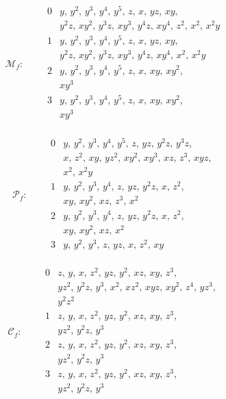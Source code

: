 \documentclass[11pt]{amsart}
\theoremstyle{definition}
\theoremstyle{remark}
\numberwithin{equation}{section}
\begin{document}
\[
\mathcal M_f:\qquad\begin{array}{c|l}
0&y,\,y^{2},\,y^{3},\,y^{4},\,y^{5},\,z,\,x,\,yz,\,xy,\\
&y^{2}z,\,xy^{2},\,y^{3}z,\,xy^{3},\,y^{4}z,\,xy^{4},\,z^{2},\,x^{2},\,x^{2}y\\
1&y,\,y^{2},\,y^{3},\,y^{4},\,y^{5},\,z,\,x,\,yz,\,xy,\\
&y^{2}z,\,xy^{2},\,y^{3}z,\,xy^{3},\,y^{4}z,\,xy^{4},\,x^{2},\,x^{2}y\\
2&y,\,y^{2},\,y^{3},\,y^{4},\,y^{5},\,z,\,x,\,xy,\,xy^{2},\\
&xy^{3}\\
3&y,\,y^{2},\,y^{3},\,y^{4},\,y^{5},\,z,\,x,\,xy,\,xy^{2},\\
&xy^{3}\\
\end{array}
\]

\[
\mathcal P_f:\qquad\begin{array}{c|l}
0&y,\,y^{2},\,y^{3},\,y^{4},\,y^{5},\,z,\,yz,\,y^{2}z,\,y^{3}z,\\
&x,\,z^{2},\,xy,\,yz^{2},\,xy^{2},\,xy^{3},\,xz,\,z^{3},\,xyz,\\
&x^{2},\,x^{2}y\\
1&y,\,y^{2},\,y^{3},\,y^{4},\,z,\,yz,\,y^{2}z,\,x,\,z^{2},\\
&xy,\,xy^{2},\,xz,\,z^{3},\,x^{2}\\
2&y,\,y^{2},\,y^{3},\,y^{4},\,z,\,yz,\,y^{2}z,\,x,\,z^{2},\\
&xy,\,xy^{2},\,xz,\,x^{2}\\
3&y,\,y^{2},\,y^{3},\,z,\,yz,\,x,\,z^{2},\,xy\\
\end{array}
\]

\[
\mathcal C_f:\qquad\begin{array}{c|l}
0&z,\,y,\,x,\,z^{2},\,yz,\,y^{2},\,xz,\,xy,\,z^{3},\\
&yz^{2},\,y^{2}z,\,y^{3},\,x^{2},\,xz^{2},\,xyz,\,xy^{2},\,z^{4},\,yz^{3},\\
&y^{2}z^{2}\\
1&z,\,y,\,x,\,z^{2},\,yz,\,y^{2},\,xz,\,xy,\,z^{3},\\
&yz^{2},\,y^{2}z,\,y^{3}\\
2&z,\,y,\,x,\,z^{2},\,yz,\,y^{2},\,xz,\,xy,\,z^{3},\\
&yz^{2},\,y^{2}z,\,y^{3}\\
3&z,\,y,\,x,\,z^{2},\,yz,\,y^{2},\,xz,\,xy,\,z^{3},\\
&yz^{2},\,y^{2}z,\,y^{3}\\
\end{array}
\]
\end{document}
